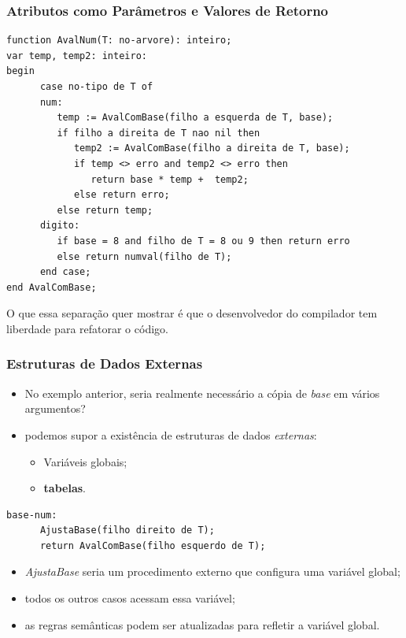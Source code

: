 \documentclass[table]{beamer}
\begin{document}
\begin{frame}[fragile]
   \frametitle{Atributos como Parâmetros e Valores de Retorno}
   \scriptsize
   \begin{verbatim}
function AvalNum(T: no-arvore): inteiro;
var temp, temp2: inteiro:
begin
      case no-tipo de T of
      num:
         temp := AvalComBase(filho a esquerda de T, base);
         if filho a direita de T nao nil then
            temp2 := AvalComBase(filho a direita de T, base);
            if temp <> erro and temp2 <> erro then 
               return base * temp +  temp2;
            else return erro;
         else return temp;
      digito:
         if base = 8 and filho de T = 8 ou 9 then return erro
         else return numval(filho de T);
      end case;
end AvalComBase;
   \end{verbatim}
   \normalsize
   O que essa separação quer mostrar é que o desenvolvedor do compilador tem liberdade para refatorar o código.
\end{frame}

\begin{frame}[fragile]
   \frametitle{Estruturas de Dados Externas}
   \begin{itemize}
      \item No exemplo anterior, seria realmente necessário a cópia de \textit{base} em vários argumentos?
      \item podemos supor a existência de estruturas de dados \textit{externas}:
      \begin{itemize}
         \item Variáveis globais;
         \item \textbf{tabelas}.
      \end{itemize}
   \end{itemize}
   \begin{verbatim}
base-num:
      AjustaBase(filho direito de T);
      return AvalComBase(filho esquerdo de T);
   \end{verbatim}
   \begin{itemize}
      \item \textit{AjustaBase} seria um procedimento externo que configura uma variável global;
      \item todos os outros casos acessam essa variável;
      \item as regras semânticas podem ser atualizadas para refletir a variável global.
   \end{itemize}
\end{frame}
\end{document}
